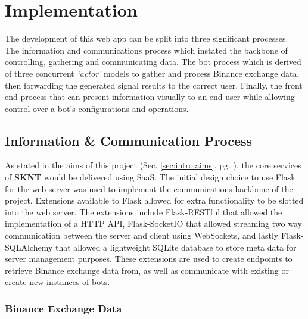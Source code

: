 %
\chapter{Implementation}
\label{sec:implementation}

The development of this web app can be split into three significant processes. The information and communications process which instated the backbone of controlling, gathering and communicating data. The bot process which is derived of three concurrent \textit{`actor'} models to gather and process Binance exchange data, then forwarding the generated signal results to the correct user. Finally, the front end process that can present information visually to an end user while allowing control over a bot's configurations and operations.

\section{Information \& Communication Process}
\label{sec:implementation:info_comm}

\noindent As stated in the aims of this project (Sec. \ref{sec:intro:aims}, pg. \pageref{sec:intro:aims}), the core services of \textbf{SKNT} would be delivered using SaaS. The initial design choice to use Flask for the web server was used to implement the communications backbone of the project. Extensions available to Flask allowed for extra functionality to be slotted into the web server. The extensions include Flask-RESTful that allowed the implementation of a HTTP API, Flask-SocketIO that allowed streaming two way communication between the server and client using WebSockets, and lastly Flask-SQLAlchemy that allowed a lightweight SQLite database to store meta data for server management purposes. These extensions are used to create endpoints to retrieve Binance exchange data from, as well as communicate with existing or create new instances of bots.

\subsection{Binance Exchange Data}
\label{sec:implementation:info_comm:binance_exchange_data}




